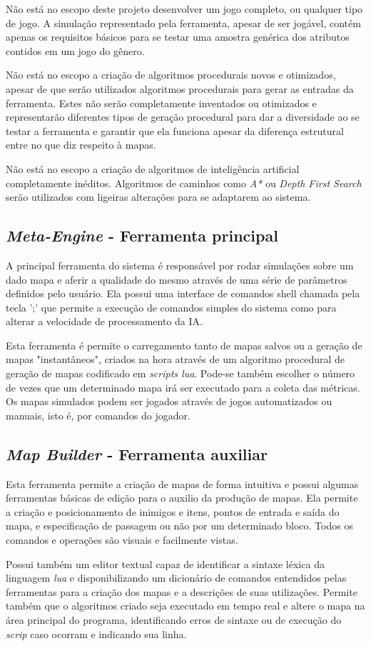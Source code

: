 Não está no escopo deste projeto desenvolver um jogo completo, ou qualquer tipo de jogo. A simulação representado pela ferramenta, apesar de ser jogável, contém apenas os requisitos básicos para se testar uma amostra genérica dos atributos contidos em um jogo do gênero.

Não está no escopo a criação de algoritmos procedurais novos e otimizados, apesar de que serão utilizados algoritmos procedurais para gerar as entradas da ferramenta. Estes não serão completamente inventados ou otimizados e representarão diferentes tipos de geração procedural para dar a diversidade ao se testar a ferramenta e garantir que ela funciona apesar da diferença estrutural entre no que diz respeito à mapas.

Não está no escopo a criação de algoritmos de inteligência artificial completamente inéditos. Algoritmos de caminhos como \textit{A*} ou \textit{Depth First Search} serão utilizados com ligeiras alterações para se adaptarem ao sistema. 

\subsection{\textit{Meta-Engine} - Ferramenta principal}

A principal ferramenta do sistema é responsável por rodar simulações sobre um dado mapa e aferir a qualidade do mesmo através de uma série de parâmetros definidos pelo usuário. Ela possui uma interface de comandos shell chamada pela tecla ';' que permite a execução de comandos simples do sistema como para alterar a velocidade de processamento da IA. 

Esta ferramenta é permite o carregamento tanto de mapas salvos ou a geração de mapas "instantâneos", criados na hora através de um algoritmo procedural de geração de mapas codificado em \textit{scripts lua}. Pode-se também escolher o número de vezes que um determinado mapa irá ser executado para a coleta das métricas. Os mapas simulados podem ser jogados através de jogos automatizados ou manuais, isto é, por comandos do jogador. 

\subsection{\textit{Map Builder} - Ferramenta auxiliar}

Esta ferramenta permite a criação de mapas de forma intuitiva e possui algumas ferramentas básicas de edição para o auxilio da produção de mapas. Ela permite a criação e posicionamento de inimigos e itens, pontos de entrada e saída do mapa, e especificação de passagem ou não por um determinado bloco. Todos os comandos e operações são visuais e facilmente vistas.

Possui também um editor textual capaz de identificar a sintaxe léxica da linguagem \textit{lua} e disponibilizando um dicionário de comandos entendidos pelas ferramentas para a criação dos mapas e a descrições de suas utilizações. Permite também que o algoritmos criado seja executado em tempo real e altere o mapa na área principal do programa, identificando erros de sintaxe ou de execução do \textit{scrip} caso ocorram e indicando sua linha.